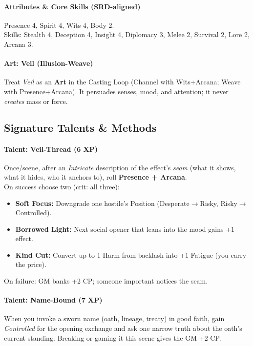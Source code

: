 \paragraph{Attributes \& Core Skills (SRD-aligned)}
Presence 4, Spirit 4, Wits 4, Body 2. \\
Skills: Stealth 4, Deception 4, Insight 4, Diplomacy 3, Melee 2, Survival 2, Lore 2, Arcana 3.

\paragraph{Art: Veil (Illusion-Weave)}
Treat \emph{Veil} as an \textbf{Art} in the Casting Loop (Channel with Wits+Arcana; Weave with Presence+Arcana). It persuades senses, mood, and attention; it never \emph{creates} mass or force.

\subsection{Signature Talents \& Methods}
\paragraph{Talent: Veil-Thread (6 XP)}
Once/scene, after an \emph{Intricate} description of the effect's \emph{seam} (what it shows, what it hides, who it anchors to), roll \textbf{Presence + Arcana}. \\
On success choose two (crit: all three):
\begin{itemize}
  \item \textbf{Soft Focus:} Downgrade one hostile's Position (Desperate$\to$Risky, Risky$\to$Controlled).
  \item \textbf{Borrowed Light:} Next social opener that leans into the mood gains +1 effect.
  \item \textbf{Kind Cut:} Convert up to 1 Harm from backlash into +1 Fatigue (you carry the price).
\end{itemize}
On failure: GM banks +2 CP; someone important notices the seam.

\paragraph{Talent: Name-Bound (7 XP)}
When you invoke a sworn name (oath, lineage, treaty) in good faith, gain \emph{Controlled} for the opening exchange and ask one narrow truth about the oath's current standing. Breaking or gaming it this scene gives the GM +2 CP.

